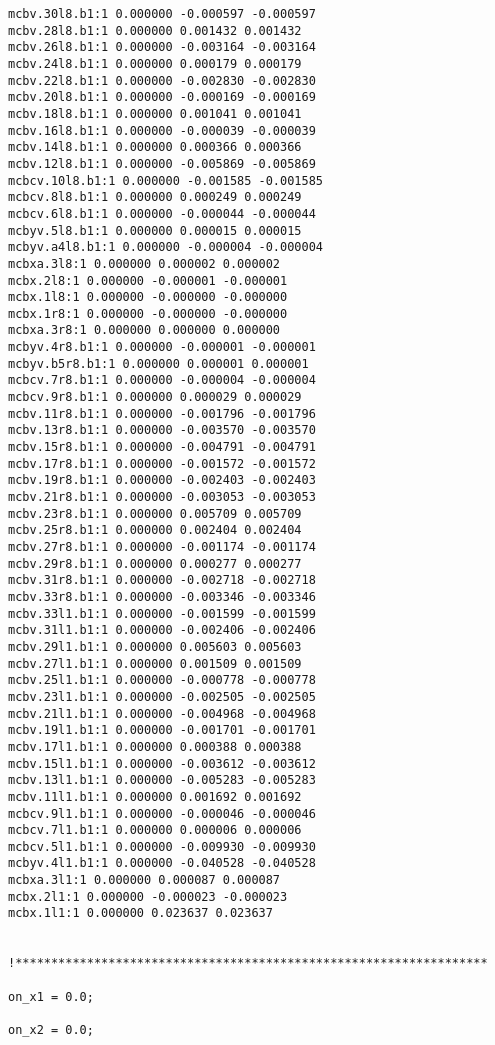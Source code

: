 \begin{verbatim}
mcbv.30l8.b1:1 0.000000 -0.000597 -0.000597
mcbv.28l8.b1:1 0.000000 0.001432 0.001432
mcbv.26l8.b1:1 0.000000 -0.003164 -0.003164
mcbv.24l8.b1:1 0.000000 0.000179 0.000179
mcbv.22l8.b1:1 0.000000 -0.002830 -0.002830
mcbv.20l8.b1:1 0.000000 -0.000169 -0.000169
mcbv.18l8.b1:1 0.000000 0.001041 0.001041
mcbv.16l8.b1:1 0.000000 -0.000039 -0.000039
mcbv.14l8.b1:1 0.000000 0.000366 0.000366
mcbv.12l8.b1:1 0.000000 -0.005869 -0.005869
mcbcv.10l8.b1:1 0.000000 -0.001585 -0.001585
mcbcv.8l8.b1:1 0.000000 0.000249 0.000249
mcbcv.6l8.b1:1 0.000000 -0.000044 -0.000044
mcbyv.5l8.b1:1 0.000000 0.000015 0.000015
mcbyv.a4l8.b1:1 0.000000 -0.000004 -0.000004
mcbxa.3l8:1 0.000000 0.000002 0.000002
mcbx.2l8:1 0.000000 -0.000001 -0.000001
mcbx.1l8:1 0.000000 -0.000000 -0.000000
mcbx.1r8:1 0.000000 -0.000000 -0.000000
mcbxa.3r8:1 0.000000 0.000000 0.000000
mcbyv.4r8.b1:1 0.000000 -0.000001 -0.000001
mcbyv.b5r8.b1:1 0.000000 0.000001 0.000001
mcbcv.7r8.b1:1 0.000000 -0.000004 -0.000004
mcbcv.9r8.b1:1 0.000000 0.000029 0.000029
mcbv.11r8.b1:1 0.000000 -0.001796 -0.001796
mcbv.13r8.b1:1 0.000000 -0.003570 -0.003570
mcbv.15r8.b1:1 0.000000 -0.004791 -0.004791
mcbv.17r8.b1:1 0.000000 -0.001572 -0.001572
mcbv.19r8.b1:1 0.000000 -0.002403 -0.002403
mcbv.21r8.b1:1 0.000000 -0.003053 -0.003053
mcbv.23r8.b1:1 0.000000 0.005709 0.005709
mcbv.25r8.b1:1 0.000000 0.002404 0.002404
mcbv.27r8.b1:1 0.000000 -0.001174 -0.001174
mcbv.29r8.b1:1 0.000000 0.000277 0.000277
mcbv.31r8.b1:1 0.000000 -0.002718 -0.002718
mcbv.33r8.b1:1 0.000000 -0.003346 -0.003346
mcbv.33l1.b1:1 0.000000 -0.001599 -0.001599
mcbv.31l1.b1:1 0.000000 -0.002406 -0.002406
mcbv.29l1.b1:1 0.000000 0.005603 0.005603
mcbv.27l1.b1:1 0.000000 0.001509 0.001509
mcbv.25l1.b1:1 0.000000 -0.000778 -0.000778
mcbv.23l1.b1:1 0.000000 -0.002505 -0.002505
mcbv.21l1.b1:1 0.000000 -0.004968 -0.004968
mcbv.19l1.b1:1 0.000000 -0.001701 -0.001701
mcbv.17l1.b1:1 0.000000 0.000388 0.000388
mcbv.15l1.b1:1 0.000000 -0.003612 -0.003612
mcbv.13l1.b1:1 0.000000 -0.005283 -0.005283
mcbv.11l1.b1:1 0.000000 0.001692 0.001692
mcbcv.9l1.b1:1 0.000000 -0.000046 -0.000046
mcbcv.7l1.b1:1 0.000000 0.000006 0.000006
mcbcv.5l1.b1:1 0.000000 -0.009930 -0.009930
mcbyv.4l1.b1:1 0.000000 -0.040528 -0.040528
mcbxa.3l1:1 0.000000 0.000087 0.000087
mcbx.2l1:1 0.000000 -0.000023 -0.000023
mcbx.1l1:1 0.000000 0.023637 0.023637


!******************************************************************

on_x1 = 0.0;

on_x2 = 0.0;


\end{verbatim}
